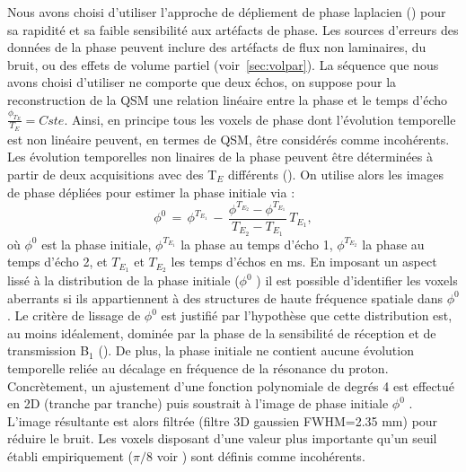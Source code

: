 {Nous avons choisi d’utiliser l’approche de dépliement de phase laplacien (\cite{Schofield2003}) pour sa rapidité
et sa faible sensibilité aux artéfacts de phase. Les sources d’erreurs des données de la phase peuvent
inclure des artéfacts de flux non laminaires, du bruit, ou des effets de volume partiel (voir~\ref{sec:volpar}). La
séquence que nous avons choisi d’utiliser ne comporte que deux échos, on suppose pour la
reconstruction de la QSM une relation linéaire entre la phase et le temps d’écho $\frac{\phi_{T_E}}{T_E}=Cste$. Ainsi,
en principe tous les voxels de phase dont l’évolution temporelle est non linéaire peuvent, en termes
de QSM, être considérés comme incohérents. Les évolution temporelles non linaires de la phase
peuvent être déterminées à partir de deux acquisitions avec des T$_E$ différents (\cite{Schweser2011}). On utilise alors les
images de phase dépliées pour estimer la phase initiale via :
\begin{equation}
\phi^0\,=\,\phi^{T_{E_1}}\,-\,\frac{\phi^{T_{E_2}}-\phi^{T_{E_1}}}{T_{E_2}-T_{E_1}}\,T_{E_1},
\end{equation}
où $\phi^0$ est la phase initiale, $\phi^{T_{E_1}}$ la phase au temps d’écho 1, $\phi^{T_{E_2}}$ la phase au temps d’écho 2, et $T_{E_1}$
et $T_{E_2}$ les temps d’échos en ms. En imposant un aspect lissé à la distribution de la phase initiale ($\phi^0$ ) il
est possible d’identifier les voxels aberrants si ils appartiennent à des structures de haute fréquence
spatiale dans $\phi^0$ . Le critère de lissage de $\phi^0$ est justifié par l’hypothèse que cette distribution est, au
moins idéalement, dominée par la phase de la sensibilité de réception et de transmission B$_1$ (\cite{Hoult2000}). De
plus, la phase initiale ne contient aucune évolution temporelle reliée au décalage en fréquence de la
résonance du proton. Concrètement, un ajustement d’une fonction polynomiale de degrés 4 est
effectué en 2D (tranche par tranche) puis soustrait à l’image de phase initiale $\phi^0$ . L’image résultante
est alors filtrée (filtre 3D gaussien FWHM=2.35 mm) pour réduire le bruit. Les voxels disposant d’une
valeur plus importante qu’un seuil établi empiriquement ($\pi/8$ voir \cite{Schweser2011}) sont définis comme incohérents.

}
